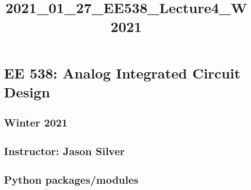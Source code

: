 \documentclass[11pt]{article}
\title{2021\_01\_27\_EE538\_Lecture4\_W2021}
\begin{document}
    
    \maketitle
    
    

    
    \hypertarget{ee-538-analog-integrated-circuit-design}{%
\section{EE 538: Analog Integrated Circuit
Design}\label{ee-538-analog-integrated-circuit-design}}

\hypertarget{winter-2021}{%
\subsection{Winter 2021}\label{winter-2021}}

\hypertarget{instructor-jason-silver}{%
\subsection{Instructor: Jason Silver}\label{instructor-jason-silver}}

    \hypertarget{python-packagesmodules}{%
\subsection{Python packages/modules}\label{python-packagesmodules}}
\end{document}
